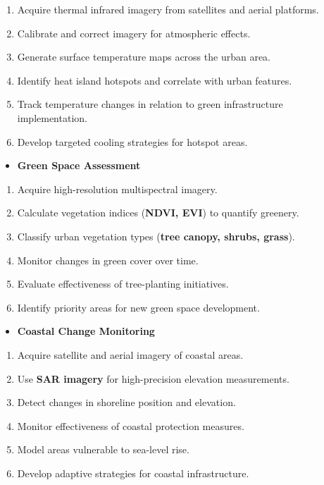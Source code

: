 \documentclass[
  letterpaper,
  DIV=11,
  numbers=noendperiod]{scrreprt}
\providecommand{\tightlist}{%
  \setlength{\itemsep}{0pt}\setlength{\parskip}{0pt}}\usepackage{longtable,booktabs,array}
\begin{document}
\begin{enumerate}
\def\labelenumi{\arabic{enumi}.}
\tightlist
\item
  Acquire thermal infrared imagery from satellites and aerial platforms.
\item
  Calibrate and correct imagery for atmospheric effects.
\item
  Generate surface temperature maps across the urban area.
\item
  Identify heat island hotspots and correlate with urban features.
\item
  Track temperature changes in relation to green infrastructure
  implementation.
\item
  Develop targeted cooling strategies for hotspot areas.
\end{enumerate}

\begin{itemize}
\tightlist
\item
  \textbf{Green Space Assessment}
\end{itemize}

\begin{enumerate}
\def\labelenumi{\arabic{enumi}.}
\tightlist
\item
  Acquire high-resolution multispectral imagery.
\item
  Calculate vegetation indices (\textbf{NDVI, EVI}) to quantify
  greenery.
\item
  Classify urban vegetation types (\textbf{tree canopy, shrubs, grass}).
\item
  Monitor changes in green cover over time.
\item
  Evaluate effectiveness of tree-planting initiatives.
\item
  Identify priority areas for new green space development.
\end{enumerate}

\begin{itemize}
\tightlist
\item
  \textbf{Coastal Change Monitoring}
\end{itemize}

\begin{enumerate}
\def\labelenumi{\arabic{enumi}.}
\tightlist
\item
  Acquire satellite and aerial imagery of coastal areas.
\item
  Use \textbf{SAR imagery} for high-precision elevation measurements.
\item
  Detect changes in shoreline position and elevation.
\item
  Monitor effectiveness of coastal protection measures.
\item
  Model areas vulnerable to sea-level rise.
\item
  Develop adaptive strategies for coastal infrastructure.
\end{enumerate}
\end{document}
